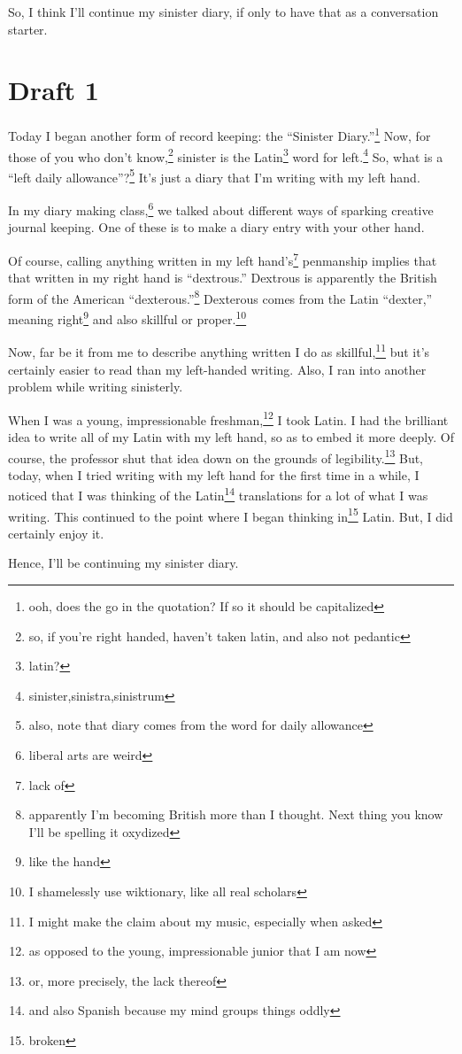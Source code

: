 \documentclass[12pt]{article}[titlepage]
\newcommand{\say}[1]{``#1''}
\newcommand{\1}{\={a}}
\newcommand{\2}{\={e}}
\newcommand{\3}{\={\i}}
\newcommand{\4}{\=o}
\newcommand{\5}{\=u}
\newcommand{\6}{\={A}}
\renewcommand{\,}{\textsuperscript{,}}
\begin{document}
So, I think I'll continue my sinister diary, if only to have that as a conversation starter.
\section{Draft 1}
Today I began another form of record keeping: the \say{Sinister Diary.}\footnote{ooh, does the go in the quotation? If so it should be capitalized}
Now, for those of you who don't know,\footnote{so, if you're right handed, haven't taken latin, and also not pedantic} sinister is the Latin\footnote{latin?} word for left.\footnote{sinister,sinistra,sinistrum}
So, what is a \say{left daily allowance}?\footnote{also, note that diary comes from the word for daily allowance}
It's just a diary that I'm writing with my left hand.

In my diary making class,\footnote{liberal arts are weird} we talked about different ways of sparking creative journal keeping.
One of these is to make a diary entry with your other hand.

Of course, calling anything written in my left hand's\footnote{lack of} penmanship implies that that written in my right hand is \say{dextrous.}
Dextrous is apparently the British form of the American \say{dexterous.}\footnote{apparently I'm becoming British more than I thought. Next thing you know I'll be spelling it oxydized}
Dexterous comes from the Latin \say{dexter,} meaning right\footnote{like the hand} and also skillful or proper.\footnote{I shamelessly use wiktionary, like all real scholars}

Now, far be it from me to describe anything written I do as skillful,\footnote{I might make the claim about my music, especially when asked} but it's certainly easier to read than my left-handed writing.
Also, I ran into another problem while writing sinisterly.

When I was a young, impressionable freshman,\footnote{as opposed to the young, impressionable junior that I am now} I took Latin.
I had the brilliant idea to write all of my Latin with my left hand, so as to embed it more deeply.
Of course, the professor shut that idea down on the grounds of legibility.\footnote{or, more precisely, the lack thereof}
But, today, when I tried writing with my left hand for the first time in a while, I noticed that I was thinking of the Latin\footnote{and also Spanish because my mind groups things oddly} translations for a lot of what I was writing.
This continued to the point where I began thinking in\footnote{broken} Latin.
But, I did certainly enjoy it.

Hence, I'll be continuing my sinister diary.
\end{document}

